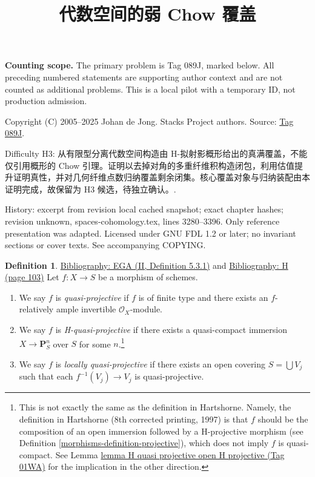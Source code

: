 \documentclass{amsart}
\newenvironment{reference}{\comment}{\endcomment}
\theoremstyle{plain}
\theoremstyle{definition}
\newtheorem{definition}[subsection]{Definition}
\theoremstyle{remark}
\numberwithin{equation}{subsection}
\begin{document}
\title[Stacks Project, Tag 089J]{代数空间的弱 Chow 覆盖}
\maketitle
\noindent\textbf{Counting scope.} The primary problem is Tag 089J, marked below. All preceding numbered statements are supporting author context and are not counted as additional problems. This is a local pilot with a temporary ID, not production admission.


\noindent Copyright (C) 2005--2025 Johan de Jong. Stacks Project authors. Source: \href{https://stacks.math.columbia.edu/tag/089J}{Tag 089J}.

\noindent Difficulty H3: 从有限型分离代数空间构造由 H-拟射影概形给出的真满覆盖，不能仅引用概形的 Chow 引理。证明以去掉对角的多重纤维积构造闭包，利用估值提升证明真性，并对几何纤维点数归纳覆盖剩余闭集。核心覆盖对象与归纳装配由本证明完成，故保留为 H3 候选，待独立确认。.

\noindent History: excerpt from revision local cached snapshot; exact chapter hashes; revision unknown, spaces-cohomology.tex, lines 3280--3396. Only reference presentation was adapted. Licensed under GNU FDL 1.2 or later; no invariant sections or cover texts. See accompanying COPYING.

\begin{definition}
\label{morphisms-definition-quasi-projective}
\begin{reference}
\href{https://stacks.math.columbia.edu/bibliography}{Bibliography: EGA (II, Definition 5.3.1)} and \href{https://stacks.math.columbia.edu/bibliography}{Bibliography: H (page 103)}
\end{reference}
Let $f : X \to S$ be a morphism of schemes.
\begin{enumerate}
\item We say $f$ is {\it quasi-projective} if $f$ is of finite type
and there exists an $f$-relatively ample invertible $\mathcal{O}_X$-module.
\item We say $f$ is {\it H-quasi-projective} if there exists
a quasi-compact immersion $X \to \mathbf{P}^n_S$ over $S$ for some
$n$.\footnote{This is not exactly the same as the definition in Hartshorne.
Namely, the definition in Hartshorne (8th corrected printing, 1997) is that
$f$ should be the composition of an open immersion followed by a H-projective
morphism (see Definition \ref{morphisms-definition-projective}), which does not imply
$f$ is quasi-compact. See
Lemma \href{https://stacks.math.columbia.edu/tag/01WA}{lemma H quasi projective open H projective (Tag 01WA)} for
the implication in the other direction.}
\item We say $f$ is {\it locally quasi-projective} if there exists
an open covering $S = \bigcup V_j$ such that each $f^{-1}(V_j) \to V_j$
is quasi-projective.
\end{enumerate}
\end{definition}
\end{document}
